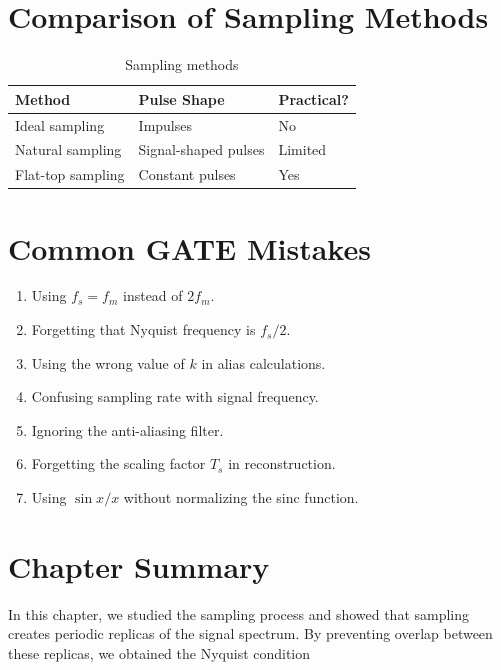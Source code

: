 \section{Comparison of Sampling Methods}

\begin{table}[H]
\centering
\caption{Sampling methods}
\begin{tabular}{|p{4cm}|p{5cm}|p{3cm}|}
\hline
\textbf{Method} & \textbf{Pulse Shape} & \textbf{Practical?}\\
\hline
Ideal sampling & Impulses & No\\
\hline
Natural sampling & Signal-shaped pulses & Limited\\
\hline
Flat-top sampling & Constant pulses & Yes\\
\hline
\end{tabular}
\end{table}


\section{Common GATE Mistakes}

\begin{enumerate}
\item Using \(f_s=f_m\) instead of \(2f_m\).
\item Forgetting that Nyquist frequency is \(f_s/2\).
\item Using the wrong value of \(k\) in alias calculations.
\item Confusing sampling rate with signal frequency.
\item Ignoring the anti-aliasing filter.
\item Forgetting the scaling factor \(T_s\) in reconstruction.
\item Using \(\sin x/x\) without normalizing the sinc function.
\end{enumerate}


\section{Chapter Summary}

In this chapter, we studied the sampling process and showed that sampling
creates periodic replicas of the signal spectrum. By preventing overlap between
these replicas, we obtained the Nyquist condition

